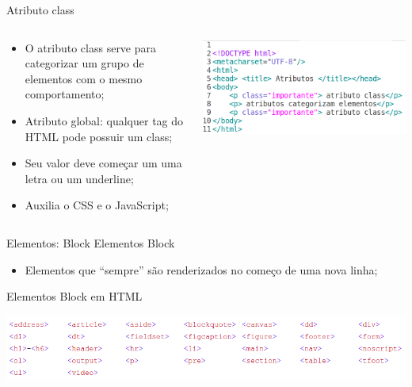 \documentclass{beamer}
\begin{document}
\begin{frame}{Atributo class}
  \begin{columns}
    \begin{column}{0.45 \textwidth}
      \small
     \begin{itemize}
      \item O atributo class serve para categorizar um grupo de elementos com o 
mesmo comportamento;
       \item Atributo global: qualquer tag do HTML pode possuir um class;
       \item Seu valor deve começar um uma letra ou um underline;
       \item Auxilia o CSS e o JavaScript;
     \end{itemize}
    \end{column}
    
    \begin{column}{0.5\textwidth}
     \includegraphics[height=0.3\paperheight]{fig/aula1/html11.png}
    \end{column}
  \end{columns}
\end{frame}
\begin{frame}{Elementos: Block}
  Elementos Block
     \begin{itemize}
      \item Elementos que “sempre” são renderizados no começo de
uma nova linha;
     \end{itemize}
 
 Elementos Block em HTML
  \vspace{0.3cm}
 \begin{center}
     \includegraphics[height=0.18\paperheight]{fig/aula1/html12.png}
   \end{center}

\end{frame}
\end{document}
